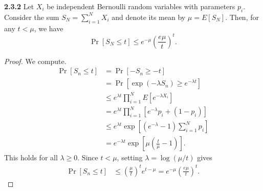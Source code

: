 \documentclass[11pt,letterpaper]{report}
\begin{document}
\noindent\textbf{2.3.2}
Let $X_i$ be independent Bernoulli random variables with parameters $p_i$. Consider the sum $S_N = \sum_{i=1}^NX_i$ and denote its mean by $\mu = E[S_N]$. Then, for any $t<\mu$, we have
\[
\Pr[S_N\leq t]\leq e^{-\mu}\left(\frac{e\mu}{t}\right)^t.
\]
\begin{proof}
	We compute.
	\begin{align*}
		\Pr[S_n \leq t] &= \Pr[-S_n \geq -t]\\
		&= \Pr[\exp(-\lambda S_n) \geq e^{-\lambda t}]\\
		&\leq e^{\lambda t}\prod_{i=1}^NE[e^{-\lambda X_i}]\\
		&= e^{\lambda t}\prod_{i=1}^N[e^{-\lambda}p_i + (1-p_i)]\\
		&\leq e^{\lambda t}\exp\left[(e^{-\lambda}-1)\sum_{i=1}^Np_i \right]\\
		&= e^{-\lambda t}\exp\left[\mu\left(\frac{t}{\mu}-1\right)\right].
	\end{align*}
	This holds for all $\lambda \geq 0$. Since $t<\mu$, setting $\lambda = \log(\mu/t)$ gives
	\begin{align*}
		\Pr[S_n \leq t] &\leq \left(\frac{\mu}{t}\right)^te^{t-\mu} = e^{-\mu}\left(\frac{e\mu}{t}\right)^t.
	\end{align*}
\end{proof}
\end{document}
